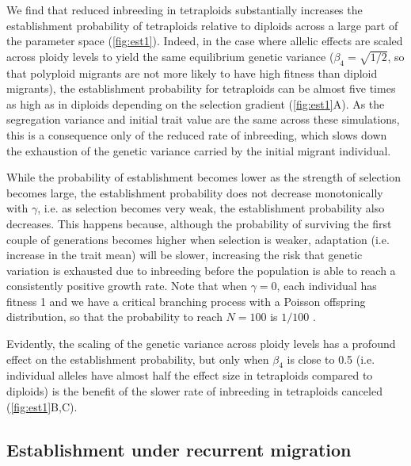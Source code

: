 \documentclass[12pt,a4paper]{article}
\begin{document}
We find that reduced inbreeding in tetraploids substantially increases the
establishment probability of tetraploids relative to diploids across a large
part of the parameter space (\cref{fig:est1}).
Indeed, in the case where allelic effects are scaled across ploidy levels
to yield the same equilibrium genetic variance ($\beta_4 = \sqrt{1/2}$, so that
polyploid migrants are not more likely to have high fitness than diploid
migrants), the establishment probability for tetraploids can be almost five
times as high as in diploids depending on the selection gradient
(\cref{fig:est1}A).
As the segregation variance and initial trait value are the same across these
simulations, this is a consequence only of the reduced rate of inbreeding,
which slows down the exhaustion of the genetic variance carried by the initial
migrant individual.

While the probability of establishment becomes lower as the strength of
selection becomes large, the establishment probability does not decrease
monotonically with $\gamma$, i.e. as selection becomes very weak, the
establishment probability also decreases.
This happens because, although the probability of surviving the first couple of
generations becomes higher when selection is weaker, adaptation (i.e. increase
in the trait mean) will be slower,
increasing the risk that genetic variation is exhausted due to inbreeding before the
population is able to reach a consistently positive growth rate.
Note that when $\gamma = 0$, each individual has fitness 1 and we have a
critical branching process with a Poisson offspring distribution, so that the
probability to reach $N=100$ is $1/100$ \citep{barton2018}.  

Evidently, the scaling of the genetic variance across ploidy levels has a
profound effect on the establishment probability, but only when $\beta_4$ is
close to 0.5 (i.e. individual alleles have almost half the effect size in
tetraploids compared to diploids) is the benefit of the slower rate of
inbreeding in tetraploids canceled (\cref{fig:est1}B,C).



\subsection*{Establishment under recurrent migration}
\end{document}

